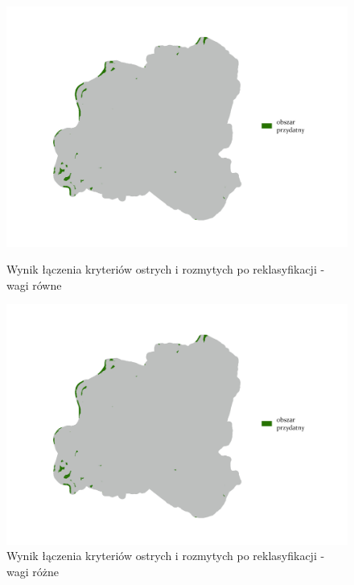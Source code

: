 \documentclass{article}
\begin{document}
\begin{figure}[H]
    \begin{minipage}[t]{0.48\textwidth}
        \centering
        \includegraphics[width=\linewidth]{img/plesna-wynik-po-reklasyfikacji.jpg}
        \caption{Wynik łączenia kryteriów ostrych i rozmytych po reklasyfikacji - wagi równe}
        \label{fig:wynik-reklasyfikacja-rowne}
    \end{minipage}
    \hfill
    \begin{minipage}[t]{0.48\textwidth}
        \centering
        \includegraphics[width=\linewidth]{img/roznewagi-plesna-wynik-po-reklasyfikacji.jpg}
        \caption{Wynik łączenia kryteriów ostrych i rozmytych po reklasyfikacji - wagi różne}
        \label{fig:wynik-reklasyfikacja-rozne}
    \end{minipage}
\end{figure}
\end{document}
